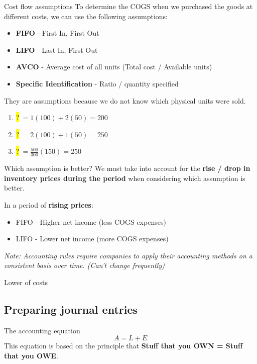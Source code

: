 \begin{theorem}
    {Cost flow assumptions}
    To determine the COGS when we purchased the goods at different costs, we can use the following assumptions:
    \begin{itemize}
        \item \textbf{FIFO} - First In, First Out
        \item \textbf{LIFO} - Last In, First Out
        \item \textbf{AVCO} - Average cost of all units (Total cost / Available units)
        \item \textbf{Specific Identification} - Ratio / quantity specified
    \end{itemize}
    They are assumptions because we do not know which physical units were sold.
    \tcblower
    \begin{enumerate}
        \item \colorbox{yellow}{?}$\ =1(100)+2(50)=200$
        \item \colorbox{yellow}{?}$\ =2(100)+1(50)=250$
        \item \colorbox{yellow}{?}$\ =\frac{500}{300}(150)=250$
    \end{enumerate}
\end{theorem}
\label{thm:cost_flow}

\begin{knBox}
    {Which assumption is better?}
    We must take into account for the \textbf{rise / drop in inventory prices during the period} when considering which assumption is better.

    In a period of \textbf{rising prices}:
    \begin{itemize}
        \item FIFO - Higher net income (less COGS expenses)
        \item LIFO - Lower net income (more COGS expenses)
    \end{itemize}
    \textit{Note: Accounting rules require companies to apply their accounting methods on a consistent basis over time. (Can't change frequently)}
\end{knBox}

\begin{theorem}
    {Lower of costs}
\end{theorem}

\subsection{Preparing journal entries}
\label{subsec:prepare}
\begin{definition}
    {The accounting equation}
    \[A = L + E\]
    This equation is based on the principle that \textbf{Stuff that you OWN = Stuff that you OWE}.
    \label{def:account_equation}
\end{definition}

